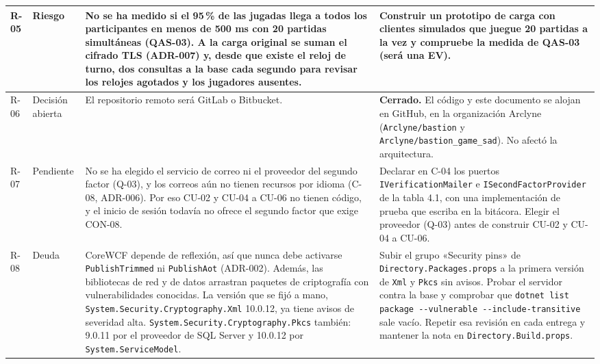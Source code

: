\documentclass[11pt,letterpaper]{article}
\begin{document}
\begin{xltabular}{\linewidth}{|p{1.4cm}|p{2.8cm}|Y|Y|}
  R-05 & Riesgo & No se ha medido si el 95\,\% de las jugadas llega a todos los participantes en menos de 500 ms con 20 partidas simultáneas (QAS-03). A la carga original se suman el cifrado TLS (ADR-007) y, desde que existe el reloj de turno, dos consultas a la base cada segundo para revisar los relojes agotados y los jugadores ausentes. & Construir un prototipo de carga con clientes simulados que juegue 20 partidas a la vez y compruebe la medida de QAS-03 (será una EV).\\\hline
  R-06 & Decisión abierta & El repositorio remoto será GitLab o Bitbucket. & \textbf{Cerrado.} El código y este documento se alojan en GitHub, en la organización Arclyne (\texttt{Arclyne/\allowbreak bastion} y \texttt{Arclyne/\allowbreak bastion\_game\_sad}). No afectó la arquitectura.\\\hline
  R-07 & Pendiente & No se ha elegido el servicio de correo ni el proveedor del segundo factor (Q-03), y los correos aún no tienen recursos por idioma (C-08, ADR-006). Por eso CU-02 y CU-04 a CU-06 no tienen código, y el inicio de sesión todavía no ofrece el segundo factor que exige CON-08. & Declarar en C-04 los puertos \texttt{IVerification\allowbreak Mailer} e \texttt{ISecondFactor\allowbreak Provider} de la tabla 4.1, con una implementación de prueba que escriba en la bitácora. Elegir el proveedor (Q-03) antes de construir CU-02 y CU-04 a CU-06.\\\hline
  R-08 & Deuda & CoreWCF depende de reflexión, así que nunca debe activarse \texttt{PublishTrimmed} ni \texttt{PublishAot} (ADR-002). Además, las bibliotecas de red y de datos arrastran paquetes de criptografía con vulnerabilidades conocidas. La versión que se fijó a mano, \texttt{System.\allowbreak Security.\allowbreak Cryptography.\allowbreak Xml} 10.0.12, ya tiene avisos de severidad alta. \texttt{System.\allowbreak Security.\allowbreak Cryptography.\allowbreak Pkcs} también: 9.0.11 por el proveedor de SQL Server y 10.0.12 por \texttt{System.\allowbreak ServiceModel}. & Subir el grupo «Security pins» de \texttt{Directory.\allowbreak Packages.\allowbreak props} a la primera versión de \texttt{Xml} y \texttt{Pkcs} sin avisos. Probar el servidor contra la base y comprobar que \texttt{dotnet list package -{}-vulnerable -{}-include-transitive} sale vacío. Repetir esa revisión en cada entrega y mantener la nota en \texttt{Directory.\allowbreak Build.\allowbreak props}.\\\hline

\end{xltabular}
\end{document}
